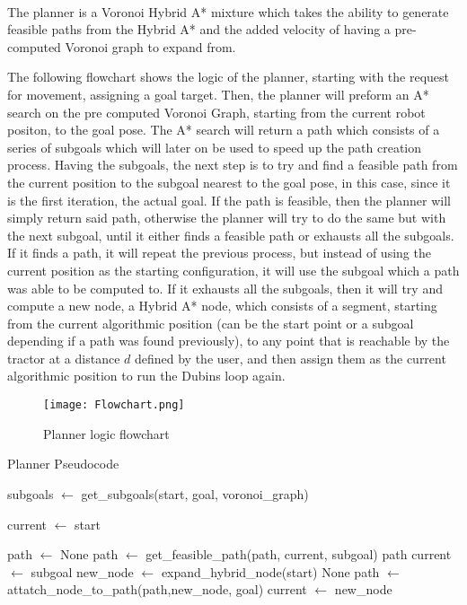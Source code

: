 \paragraph{}The planner is a Voronoi Hybrid A* mixture which takes the 
ability to generate feasible paths from the Hybrid A* and the 
added velocity of having a pre-computed Voronoi graph to expand 
from.

The following flowchart shows the logic of the planner, starting with 
the request for movement, assigning a goal target. Then, the planner will 
preform an A* search on the pre computed Voronoi Graph, starting from the current robot 
positon, to the goal pose. The A* search will return a path which consists 
of a series of subgoals which will later on be used to speed up the 
path creation process. Having the subgoals, the next step is to try and 
find a feasible path from the current position to the subgoal nearest to 
the goal pose, in this case, since it is the first iteration, the actual goal. 
If the path is feasible, then the planner will simply return said path, otherwise
 the planner will try to do the same but with the next subgoal, until it either finds 
a feasible path or exhausts all the subgoals. If it finds a path, it will 
repeat the previous process, but instead of using the current position as the 
starting configuration, it will use the subgoal which a path was able to be 
computed to. If it exhausts all the subgoals, then it will try and compute a new node, 
a Hybrid A* node, which consists of a segment, starting from the current algorithmic position 
(can be the start point or a subgoal depending if a path was found previously), to any point 
that is reachable by the tractor at a distance $d$ defined by the user, and then assign them as the 
current algorithmic position to run the Dubins loop again.
\begin{figure}[h]
    \centering
    \texttt{[image: Flowchart.png]}
    \caption{Planner logic flowchart}
\end{figure}

\begin{algorithm}
\caption{Planner Pseudocode}
\label{alg:planner}
\begin{algorithmic}[1]
    \State subgoals $\gets$ get\_subgoals(start, goal, voronoi\_graph)

    \State current $\gets$ start

    \State path $\gets$ None
        \State path $\gets$ get\_feasible\_path(path, current, subgoal)
                \State \Return path
            \Else
                \State current $\gets$ subgoal
            \EndIf
        \EndIf
    \EndFor
        \State new\_node $\gets$ expand\_hybrid\_node(start)
            \State \Return None
        \EndIf
        \State path $\gets$ attatch\_node\_to\_path(path,new\_node, goal)
        \State current $\gets$ new\_node
    \EndWhile
\EndFunction
\end{algorithmic}
\end{algorithm}

